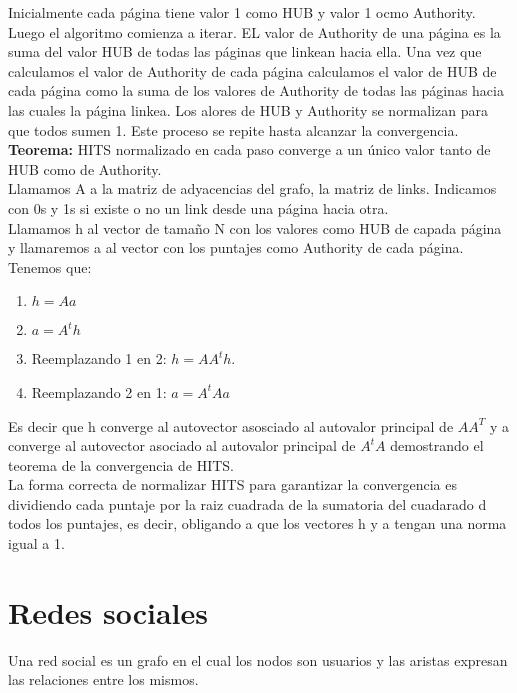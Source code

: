 \documentclass[titlepage,a4paper]{article}
\begin{document}
Inicialmente cada página tiene valor 1 como HUB y valor 1 ocmo Authority. Luego el algoritmo comienza a iterar. EL valor de Authority de una página es la suma del valor HUB de todas las páginas que linkean hacia ella. Una vez que calculamos el valor de Authority de cada página  calculamos el valor de HUB de cada página como la suma de los valores de Authority de todas las páginas hacia las cuales la página linkea. Los alores de HUB y Authority se normalizan para que todos sumen 1. Este proceso se repite hasta alcanzar la convergencia. \\

\textbf{Teorema:} HITS normalizado en cada paso converge a un único valor tanto de HUB como de Authority. \\

Llamamos A a la matriz de adyacencias del grafo, la matriz de links. Indicamos con 0s y 1s si existe o no un link desde una página hacia otra. \\

Llamamos h al vector de tamaño N con los valores como HUB de capada página y llamaremos a al vector con los puntajes como Authority de cada página. Tenemos que: 
\begin{enumerate}
\item$ h = Aa$
\item $a = A^t h$
\item Reemplazando 1 en 2: $h = AA^t h$. 
\item Reemplazando 2 en 1: $a = A^tAa$
\end{enumerate}

Es decir que h converge al autovector asosciado al autovalor principal de $AA^T$ y a converge al autovector asociado al autovalor principal de $A^tA$ demostrando el teorema de la convergencia de HITS.\\

La forma correcta de normalizar HITS para garantizar la convergencia es dividiendo cada puntaje por la raiz cuadrada de la sumatoria del cuadarado d todos los puntajes, es decir, obligando a que los vectores h y a tengan una norma igual a 1. 

\section*{Redes sociales}
Una red social es un grafo en el cual los nodos son usuarios y las aristas expresan las relaciones entre los mismos. 
\end{document}
